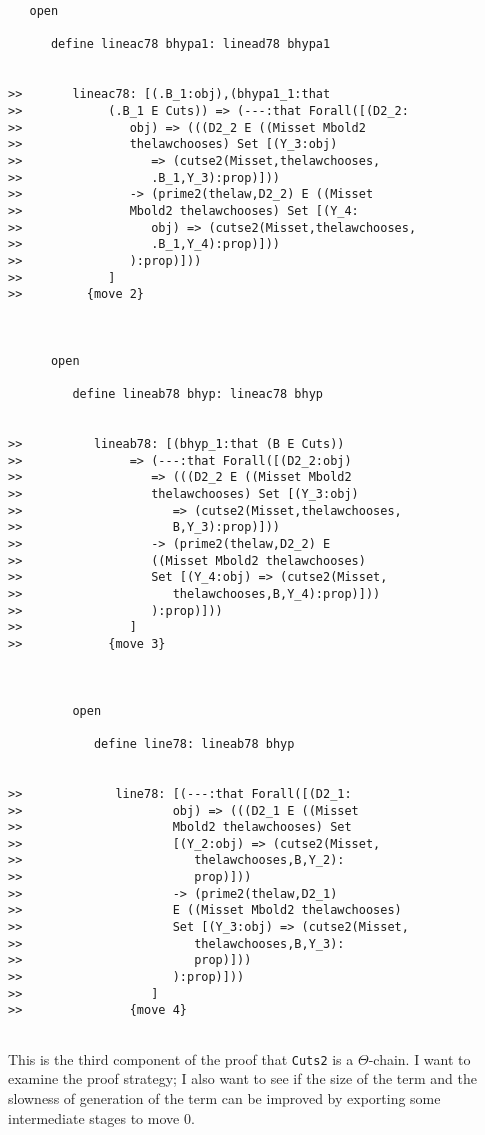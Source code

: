 \documentclass[12pt]{article}
\begin{document}
\begin{verbatim}
   open

      define lineac78 bhypa1: linead78 bhypa1


>>       lineac78: [(.B_1:obj),(bhypa1_1:that
>>            (.B_1 E Cuts)) => (---:that Forall([(D2_2:
>>               obj) => (((D2_2 E ((Misset Mbold2
>>               thelawchooses) Set [(Y_3:obj)
>>                  => (cutse2(Misset,thelawchooses,
>>                  .B_1,Y_3):prop)]))
>>               -> (prime2(thelaw,D2_2) E ((Misset
>>               Mbold2 thelawchooses) Set [(Y_4:
>>                  obj) => (cutse2(Misset,thelawchooses,
>>                  .B_1,Y_4):prop)]))
>>               ):prop)]))
>>            ]
>>         {move 2}



      open

         define lineab78 bhyp: lineac78 bhyp


>>          lineab78: [(bhyp_1:that (B E Cuts))
>>               => (---:that Forall([(D2_2:obj)
>>                  => (((D2_2 E ((Misset Mbold2
>>                  thelawchooses) Set [(Y_3:obj)
>>                     => (cutse2(Misset,thelawchooses,
>>                     B,Y_3):prop)]))
>>                  -> (prime2(thelaw,D2_2) E
>>                  ((Misset Mbold2 thelawchooses)
>>                  Set [(Y_4:obj) => (cutse2(Misset,
>>                     thelawchooses,B,Y_4):prop)]))
>>                  ):prop)]))
>>               ]
>>            {move 3}



         open

            define line78: lineab78 bhyp


>>             line78: [(---:that Forall([(D2_1:
>>                     obj) => (((D2_1 E ((Misset
>>                     Mbold2 thelawchooses) Set
>>                     [(Y_2:obj) => (cutse2(Misset,
>>                        thelawchooses,B,Y_2):
>>                        prop)]))
>>                     -> (prime2(thelaw,D2_1)
>>                     E ((Misset Mbold2 thelawchooses)
>>                     Set [(Y_3:obj) => (cutse2(Misset,
>>                        thelawchooses,B,Y_3):
>>                        prop)]))
>>                     ):prop)]))
>>                  ]
>>               {move 4}


\end{verbatim}

This is the third component of the proof that {\tt Cuts2} is a $\Theta$-chain.  I want to examine the proof strategy;  I also want to see if the size of the term and the slowness of generation of the term can be improved by exporting some intermediate stages to move 0.
\end{document}
